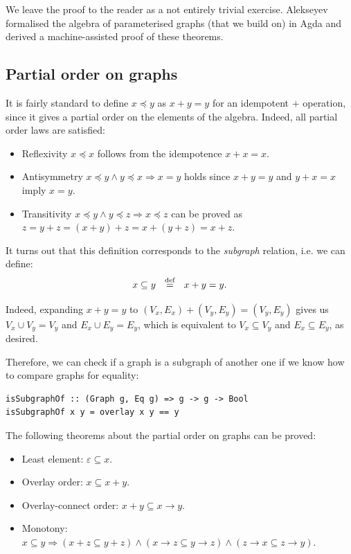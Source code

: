 We leave the proof to the reader as a not entirely trivial exercise.
Alekseyev~\citeyear{2014_alekseyev_phd} formalised the algebra of
parameterised graphs (that we build on) in Agda and derived a
machine-assisted proof of these theorems.

\subsection{Partial order on graphs}\label{sub-partial-order}

It is fairly standard to define $x \preceq y$ as $x + y = y$ for an
idempotent $+$ operation, since it gives a partial order on the elements
of the algebra. Indeed, all partial order laws are satisfied:

\begin{itemize}
     \item Reflexivity $x \preceq x$ follows from the idempotence $x + x = x$.
     \item Antisymmetry $x \preceq y \wedge y \preceq x \Rightarrow x = y$ holds
     since $x + y = y$ and $y + x = x$ imply $x = y$.
     \item Transitivity $x \preceq y \wedge y \preceq z \Rightarrow x \preceq z$
     can be proved as $z = y + z = (x + y) + z = x + (y + z) = x + z$.
 \end{itemize}

\noindent
It turns out that this definition corresponds to the \emph{subgraph} relation,
i.e. we can define:
\[
x \subseteq y~~\stackrel{\text{def}}{=}~~x + y = y.
\]

\noindent
Indeed, expanding $x + y = y$ to $(V_x,E_x) + (V_y,E_y) = (V_y,E_y)$ gives us
$V_x \cup V_y = V_y$ and $E_x \cup E_y = E_y$, which is equivalent to
$V_x \subseteq V_y$ and $E_x \subseteq E_y$, as desired.

Therefore, we can check if a graph is a subgraph of another one if we know how to
compare graphs for equality:
\begin{verbatim}
isSubgraphOf :: (Graph g, Eq g) => g -> g -> Bool
isSubgraphOf x y = overlay x y == y
\end{verbatim}

The following theorems about the partial order on graphs can be proved:

\begin{itemize}
    \item Least element: $\varepsilon \subseteq x$.
    \item Overlay order: $x \subseteq x + y$.
    \item Overlay-connect order: $x + y \subseteq x \rightarrow y$.
    \item Monotony: $x \subseteq y \Rightarrow (x + z \subseteq y + z)
    \wedge (x \rightarrow z \subseteq y \rightarrow z)
    \wedge (z \rightarrow x \subseteq z \rightarrow y)$.

\end{itemize}

